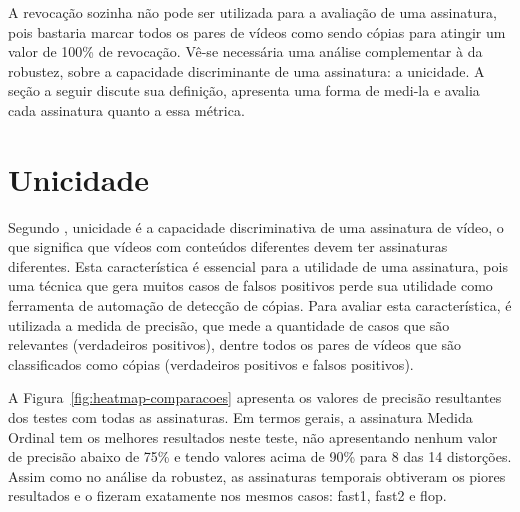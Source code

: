 
A revocação sozinha não pode ser utilizada para a avaliação de uma assinatura, pois bastaria marcar todos os pares de vídeos como sendo cópias para atingir um valor de 100\% de revocação. Vê-se necessária uma análise complementar à da robustez, sobre a capacidade discriminante de uma assinatura: a unicidade. A seção a seguir discute sua definição, apresenta uma forma de medi-la e avalia cada assinatura quanto a essa métrica.

\section{Unicidade}
\label{sec:unicidade}

Segundo , unicidade é a capacidade discriminativa de uma assinatura de vídeo, o que significa que vídeos com conteúdos diferentes devem ter assinaturas diferentes. Esta característica é essencial para a utilidade de uma assinatura, pois uma técnica que gera muitos casos de falsos positivos perde sua utilidade como ferramenta de automação de detecção de cópias. Para avaliar esta característica, é utilizada a medida de precisão, que mede a quantidade de casos que são relevantes (verdadeiros positivos), dentre todos os pares de vídeos que são classificados como cópias (verdadeiros positivos e falsos positivos)\cite{Ting2010}.


A Figura~\ref{fig:heatmap-comparacoes} apresenta os valores de precisão resultantes dos testes com todas as assinaturas. Em termos gerais, a assinatura Medida Ordinal tem os melhores resultados neste teste, não apresentando nenhum valor de precisão abaixo de 75\% e tendo valores acima de 90\% para 8 das 14 distorções. Assim como no análise da robustez, as assinaturas temporais obtiveram os piores resultados e o fizeram exatamente nos mesmos casos: fast1, fast2 e flop. 

